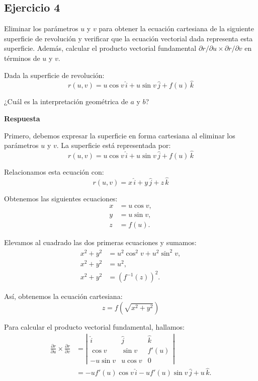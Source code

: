 \documentclass{report}
\begin{document}
\subsection*{Ejercicio 4}
Eliminar los parámetros \(u\) y \(v\) para obtener la ecuación cartesiana de la siguiente superficie de revolución y verificar que la ecuación vectorial dada representa esta superficie. Además, calcular el producto vectorial fundamental \(\partial r / \partial u \times \partial r / \partial v\) en términos de \(u\) y \(v\).

Dada la superficie de revolución:
\[
r(u, v)=u \cos v \, \hat{i} + u \sin v \, \hat{j} + f(u) \, \hat{k}
\]

¿Cuál es la interpretación geométrica de \(a\) y \(b\)?

\textbf{Respuesta}

Primero, debemos expresar la superficie en forma cartesiana al eliminar los parámetros \(u\) y \(v\). La superficie está representada por:
\[
r(u, v) = u \cos v \, \hat{i} + u \sin v \, \hat{j} + f(u) \, \hat{k}
\]

Relacionamos esta ecuación con:
\[
r(u, v) = x \, \hat{i} + y \, \hat{j} + z \, \hat{k}
\]

Obtenemos las siguientes ecuaciones:
\[
\begin{aligned}
x &= u \cos v, \\
y &= u \sin v, \\
z &= f(u).
\end{aligned}
\]

Elevamos al cuadrado las dos primeras ecuaciones y sumamos:
\[
\begin{aligned}
x^2 + y^2 &= u^2 \cos^2 v + u^2 \sin^2 v, \\
x^2 + y^2 &= u^2, \\
x^2 + y^2 &= \left( f^{-1}(z) \right)^2.
\end{aligned}
\]

Así, obtenemos la ecuación cartesiana:
\[
z = f\left( \sqrt{x^2 + y^2} \right)
\]

Para calcular el producto vectorial fundamental, hallamos:
\[
\begin{aligned}
\frac{\partial r}{\partial u} \times \frac{\partial r}{\partial v} &= \left| \begin{array}{ccc}
\hat{i} & \hat{j} & \hat{k} \\
\cos v & \sin v & f'(u) \\
-u \sin v & u \cos v & 0
\end{array} \right| \\
&= -u f'(u) \cos v \, \hat{i} - u f'(u) \sin v \, \hat{j} + u \, \hat{k}.
\end{aligned}
\]
\end{document}
